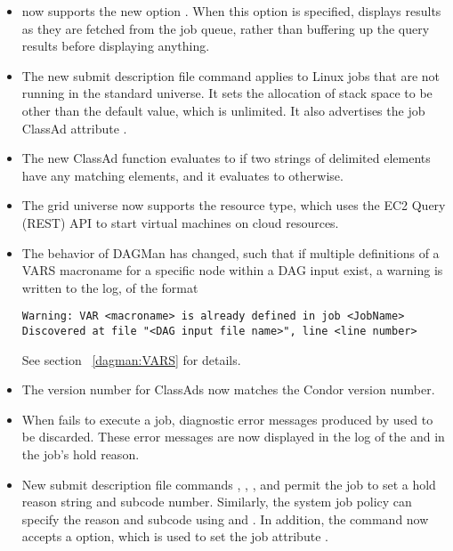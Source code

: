 \begin{itemize}

\item {} now supports the new option .
  When this option is specified,  displays results as they
  are fetched from the job queue, rather than buffering up the query
  results before displaying anything.

\item The new submit description file command  
  applies to Linux jobs that are not running in the standard universe. 
  It sets the allocation of stack space to be other than the default
  value, which is unlimited.
  It also advertises the job ClassAd attribute .

\item The new ClassAd function  evaluates to 
   if two strings of delimited elements have any matching elements,
  and it evaluates to  otherwise.

\item The grid universe now supports the  resource type,
  which uses the EC2 Query (REST) API to start virtual machines on cloud
  resources.

\item The behavior of DAGMan has changed, 
such that if multiple definitions of a VARS macroname 
for a specific node within a DAG input exist,
a warning is written to the log, of the format
\begin{verbatim}
Warning: VAR <macroname> is already defined in job <JobName>
Discovered at file "<DAG input file name>", line <line number>
\end{verbatim}
See section ~\ref{dagman:VARS} for details.

\item The version number for ClassAds now matches the Condor version number. 

\item When  fails to execute a job,
diagnostic error messages produced by  used to be discarded.
These error messages are now displayed in the log of the  
and in the job's hold reason. 

\item New submit description file commands
, ,
, and 
permit the job to set a hold reason string and subcode number.
Similarly, the system job policy can specify the reason and subcode 
using  and 
.
In addition, the  command now accepts a  option,
which is used to set the job attribute . 

\end{itemize}

